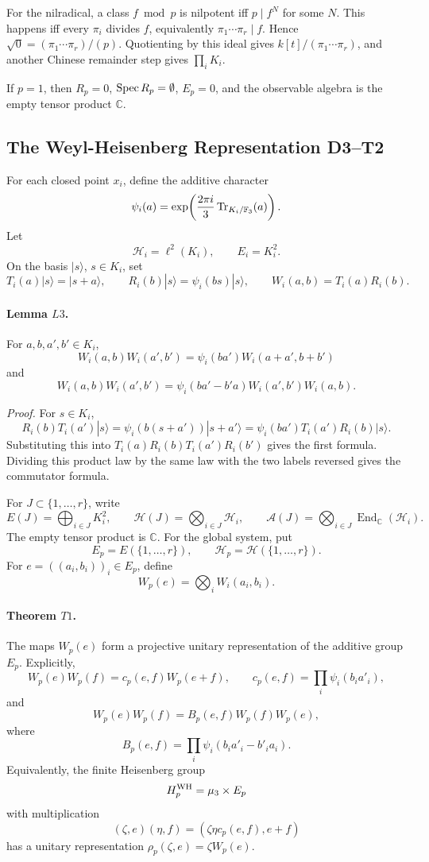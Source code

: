 For the nilradical, a class \(f\bmod p\) is nilpotent iff \(p\mid f^N\) for
some \(N\).  This happens iff every \(\pi_i\) divides \(f\), equivalently
\(\pi_1\cdots\pi_r\mid f\).  Hence
\(\sqrt0=(\pi_1\cdots\pi_r)/(p)\).  Quotienting by this ideal gives
\(k[t]/(\pi_1\cdots\pi_r)\), and another Chinese remainder step gives
\(\prod_iK_i\).

If \(p=1\), then \(R_p=0\), \(\operatorname{Spec} R_p=\emptyset\), \(E_p=0\), and the
observable algebra is the empty tensor product \(\mathbb C\).

\subsection{The Weyl-Heisenberg Representation D3--T2}

For each closed point \(x_i\), define the additive character
\[
  \psi_i(a)=
  \exp\!\left(\frac{2\pi i}{3}\operatorname{Tr}_{K_i/\mathbb F_3}(a)\right).
\]
Let
\[
  \mathcal H_i=\ell^2(K_i),\qquad
  E_i=K_i^2.
\]
On the basis \(|s\rangle\), \(s\in K_i\), set
\[
  T_i(a)|s\rangle=|s+a\rangle,\qquad
  R_i(b)|s\rangle=\psi_i(bs)|s\rangle,\qquad
  W_i(a,b)=T_i(a)R_i(b).
\]

\paragraph{Lemma \(L3\).}
For \(a,b,a',b'\in K_i\),
\[
  W_i(a,b)W_i(a',b')
  =
  \psi_i(ba')W_i(a+a',b+b')
\]
and
\[
  W_i(a,b)W_i(a',b')
  =
  \psi_i(ba'-b'a)W_i(a',b')W_i(a,b).
\]

\emph{Proof.}
For \(s\in K_i\),
\[
  R_i(b)T_i(a')|s\rangle
  =\psi_i(b(s+a'))|s+a'\rangle
  =\psi_i(ba')T_i(a')R_i(b)|s\rangle .
\]
Substituting this into \(T_i(a)R_i(b)T_i(a')R_i(b')\) gives the first formula.
Dividing this product law by the same law with the two labels reversed gives
the commutator formula.

For \(J\subset\{1,\ldots,r\}\), write
\[
  E(J)=\bigoplus_{i\in J}K_i^2,\qquad
  \mathcal H(J)=\bigotimes_{i\in J}\mathcal H_i,\qquad
  \mathcal A(J)=\bigotimes_{i\in J}\operatorname{End}_{\mathbb C}(\mathcal H_i).
\]
The empty tensor product is \(\mathbb C\).  For the global system, put
\[
  E_p=E(\{1,\ldots,r\}),\qquad
  \mathcal H_p=\mathcal H(\{1,\ldots,r\}).
\]
For \(e=((a_i,b_i))_i\in E_p\), define
\[
  W_p(e)=\bigotimes_iW_i(a_i,b_i).
\]

\paragraph{Theorem \(T1\).}
The maps \(W_p(e)\) form a projective unitary representation of the additive
group \(E_p\).  Explicitly,
\[
  W_p(e)W_p(f)=c_p(e,f)W_p(e+f),\qquad
  c_p(e,f)=\prod_i\psi_i(b_ia'_i),
\]
and
\[
  W_p(e)W_p(f)=B_p(e,f)W_p(f)W_p(e),
\]
where
\[
  B_p(e,f)=\prod_i\psi_i(b_ia'_i-b'_ia_i).
\]
Equivalently, the finite Heisenberg group
\[
  H_p^{\rm WH}=\mu_3\times E_p
\]
with multiplication
\[
  (\zeta,e)(\eta,f)=(\zeta\eta c_p(e,f),e+f)
\]
has a unitary representation \(\rho_p(\zeta,e)=\zeta W_p(e)\).

